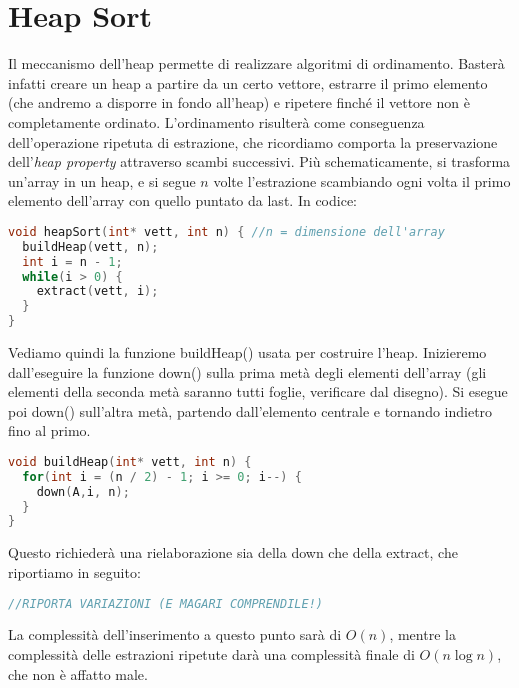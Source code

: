 \documentclass[a4paper,12pt]{article}
\begin{document}
\section{Heap Sort}
Il meccanismo dell'heap permette di realizzare algoritmi di ordinamento. Basterà infatti creare un heap
a partire da un certo vettore, estrarre il primo elemento (che andremo a disporre in fondo all'heap) e ripetere finché
il vettore non è completamente ordinato. L'ordinamento risulterà come conseguenza dell'operazione ripetuta di estrazione,
che ricordiamo comporta la preservazione dell'\textit{heap property} attraverso scambi successivi. Più schematicamente,
si trasforma un'array in un heap, e si segue $n$ volte l'estrazione scambiando ogni volta il primo elemento dell'array
con quello puntato da last. In codice:
\begin{lstlisting}[language=C++]
void heapSort(int* vett, int n) { //n = dimensione dell'array
  buildHeap(vett, n);
  int i = n - 1;
  while(i > 0) {
    extract(vett, i);
  }
}
\end{lstlisting}
 Vediamo quindi la funzione buildHeap() usata per costruire l'heap. Inizieremo
dall'eseguire la funzione down() sulla prima metà degli elementi dell'array (gli elementi della seconda metà saranno
tutti foglie, verificare dal disegno). Si esegue poi down() sull'altra metà, partendo dall'elemento centrale e tornando indietro
fino al primo.
\begin{lstlisting}[language=C++]
void buildHeap(int* vett, int n) {
  for(int i = (n / 2) - 1; i >= 0; i--) {
    down(A,i, n);
  }  
}
\end{lstlisting}
Questo richiederà una rielaborazione sia della down che della extract, che riportiamo in seguito:
\begin{lstlisting}[language=C++]
//RIPORTA VARIAZIONI (E MAGARI COMPRENDILE!)
\end{lstlisting}
La complessità dell'inserimento a questo punto sarà di $O(n)$, mentre la complessità delle estrazioni ripetute darà una complessità finale
di $O(n\log{n})$, che non è affatto male.\\
\end{document}
